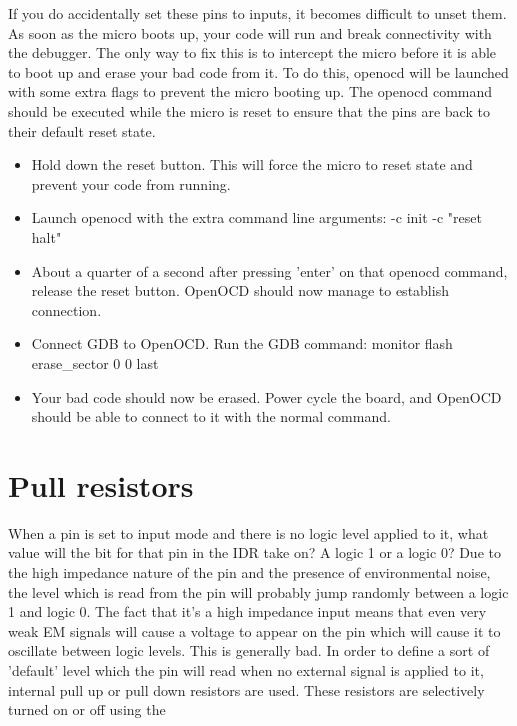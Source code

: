 If you do accidentally set these pins to inputs, it becomes difficult to unset them. As soon as the micro boots up, your code will run and break connectivity with the debugger. The only way to fix this is to intercept the micro before it is able to boot up and erase your bad code from it.
To do this, openocd will be launched with some extra flags to prevent the micro booting up. The openocd command should be executed while the micro is reset to ensure that the pins are back to their default reset state.
\begin{itemize}
  \item Hold down the reset button. This will force the micro to reset state and prevent your code from running.
  \item Launch openocd with the extra command line arguments: -c init -c "reset halt"
  \item About a quarter of a second after pressing 'enter' on that openocd command, release the reset button. OpenOCD should now manage to establish connection.
  \item Connect GDB to OpenOCD. Run the GDB command: monitor flash erase\_sector 0 0 last
  \item Your bad code should now be erased. Power cycle the board, and OpenOCD should be able to connect to it with the normal command.
\end{itemize}

\section{Pull resistors}
When a pin is set to input mode and there is no logic level applied to it, what value will the bit for that pin in the IDR take on? A logic 1 or a logic 0? Due to the high impedance nature of the pin and the presence of environmental noise, the level which is read from the pin will probably jump randomly between a logic 1 and logic 0. The fact that it's a high impedance input means that even very weak EM signals will cause a voltage to appear on the pin which will cause it to oscillate between logic levels. This is generally bad. In order to define a sort of 'default' level which the pin will read when no external signal is applied to it, internal pull up or pull down resistors are used. These resistors are selectively turned on or off using the 

